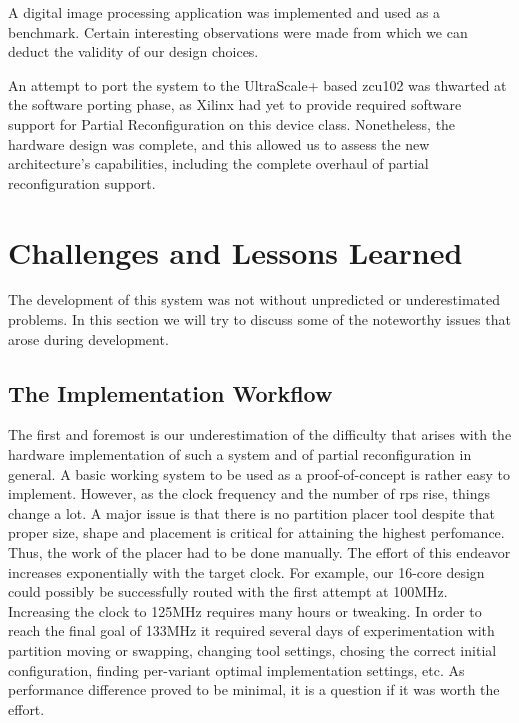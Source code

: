 A digital image processing application was implemented and used as a benchmark. 
Certain interesting observations were made from which we can deduct the validity of our design choices.

An attempt to port the system to the UltraScale+ based zcu102 was thwarted at the software porting phase,
as Xilinx had yet to provide required software support for Partial Reconfiguration on this device class.
Nonetheless, the hardware design was complete, and this allowed us to assess the new architecture's
capabilities, including the complete overhaul of partial reconfiguration support.

\section{Challenges and Lessons Learned}

The development of this system was not without unpredicted or underestimated problems. In this section
we will try to discuss some of the noteworthy issues that arose during development.

\subsection{The Implementation Workflow}

The first and foremost is our underestimation of the difficulty that arises with the hardware implementation 
of such a system and of partial reconfiguration in general. 
A basic working system to be used as a proof-of-concept is rather easy to implement.
However, as the clock frequency and the number of \glspl{rp} rise, things change a lot. A major issue is that there is
no partition placer tool despite that proper size, shape and placement is critical for attaining the highest perfomance.
Thus, the work of the placer had to be done manually. The effort of this endeavor increases exponentially with the target clock.
For example, our 16-core design could possibly be successfully routed with the first attempt at 100MHz. Increasing the clock
to 125MHz requires many hours or tweaking. In order to reach the final goal of 133MHz it required several days of experimentation
with partition moving or swapping, changing tool settings, chosing the correct initial configuration, finding per-variant
optimal implementation settings, etc. As performance difference proved to be minimal, it is a question if it was worth the effort.


